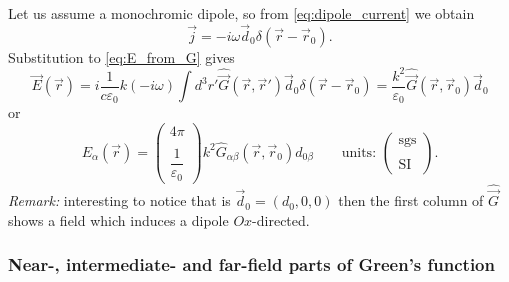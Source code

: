 \begin{testexample}
	Let us assume a monochromic dipole, so from \eqref{eq:dipole_current} we obtain
	\begin{equation}
		\vec{j} = -i\omega \vec{d}_0 \delta(\vec{r} - \vec{r}_0).
		\label{eq:dipole_curr}
	\end{equation}
	Substitution to \eqref{eq:E_from_G} gives
	\begin{equation}
		\vec{E}(\vec{r}) = i \frac{1}{c \varepsilon_0}k (-i\omega) \int d^3 r' \hat{\vec{G}}(\vec{r}, \vec{r}') \vec{d}_0 \delta(\vec{r} - \vec{r}_0) = \frac{k^2}{\varepsilon_0} \hat{\vec{G}}(\vec{r}, \vec{r}_0) \vec{d}_0
		\label{eq:dipole_field}
	\end{equation}
	or
	\begin{equation}
		E_{\alpha}(\vec{r}) = \begin{pmatrix}
		4\pi  \\ \\
		\dfrac{1}{\varepsilon_0}
		\end{pmatrix} k^2  \hat{G}_{\alpha \beta}(\vec{r}, \vec{r}_0) d_{0 \beta} \qquad \text{units: }\begin{pmatrix}
		\text{sgs}  \\ \\
		\text{SI}
		\end{pmatrix}.
	\end{equation}
	\textit{Remark:} interesting to notice that is $\vec{d}_0 = (d_0,0,0)$ then the first column of $\hat{\vec{G}}$ shows a field which induces a dipole $Ox$-directed.
\end{testexample}

\subsubsection{Near-, intermediate- and far-field parts of Green's function}

